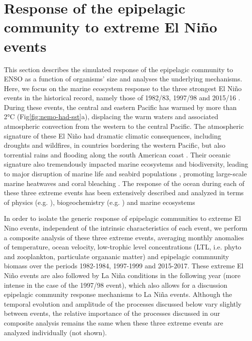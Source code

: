 \section{Response of the epipelagic community to extreme El Niño events}

This section describes the simulated response of the epipelagic community to ENSO as a function of organisms' size and analyses the underlying mechanisms. Here, we focus on  the marine ecosystem response to the three strongest El Niño events in the historical record, namely those of 1982/83, 1997/98 and 2015/16 \citep{santosoDefiningCharacteristicsENSO2017}. During these events, the central and eastern Pacific has warmed by more than 2°C (Fig\ref{fig:nemo-had-sst}a), displacing the warm waters and associated atmospheric convection from the western to the central Pacific. The atmospheric signature of these El Niño had dramatic climatic consequences, including droughts and wildfires, in countries bordering the western Pacific, but also torrential rains and flooding along the south American coast \citep{caiClimateImpactsNino2020}. Their oceanic signature also tremendously impacted marine ecosystems and biodiversity, leading to major disruption of marine life and seabird populations \citep{valleImpact198219831987}, promoting large-scale marine heatwaves \citep{holbrookKeepingPaceMarine2020} and coral bleaching \citep{claarGlobalPatternsImpacts2018}.  The response of the ocean during each of these three extreme events has been extensively described and analyzed in terms of physics  (e.g. \citealp{philanderChapter33Simulation1985, lengaigneOceanResponseMarch2002, puyModulationEquatorialPacific2019}), biogeochemistry (e.g. \citealp{barberBiologicalConsequencesNino1983, chavezBiologicalChemicalResponse1999, strammaObservedNinoConditions2016}) and marine ecosystems \citep{glynnNINOSOUTHERNOSCILLATION198219831988, glynnCoralBleachingMortality2001, eakin20142017Globalscale2019} 

In order to isolate the generic response of epipelagic communities to extreme El Nino events, independent of the intrinsic characteristics of each event, we perform a composite analysis of these three extreme events, averaging monthly anomalies of temperature, ocean velocity, low-trophic level concentrations (LTL, i.e. phyto and zooplankton, particulate organanic matter) and epipelagic commnunity biomass over the periods 1982-1984, 1997-1999 and 2015-2017. These extreme El Niño events are also followed by La Niña conditions in the following year (more intense in the case of the 1997/98 event), which also allows for a discussion epipelagic community response mechanisms to La Niña events. Although the temporal evolution and amplitude of the processes discussed below vary slightly between events, the relative importance of the processes discussed in our composite analysis remains the same when these three extreme events are analyzed individually (not shown). 

